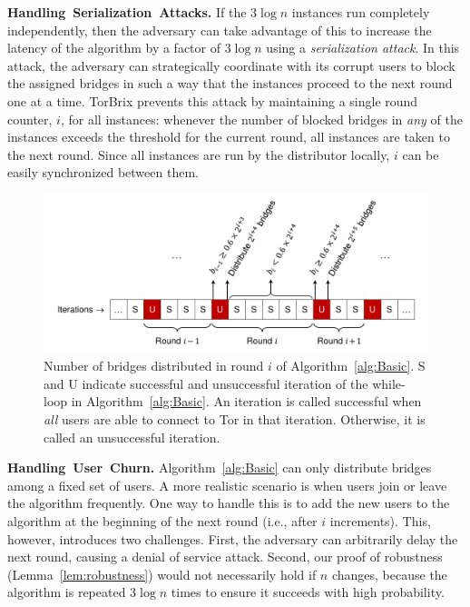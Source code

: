 \documentclass{llncs}
\newcommand{\ie}{i.e.}
\newcommand{\jared}[1]{}
\newcommand{\sfsize}{\fontsize{0.73\baselineskip}{0.73\baselineskip}\selectfont}
\newcommand{\sans}[1]{\textsf{\sfsize \mbox{#1}}}
\newcommand{\sansb}[1]{\textbf{\sans{\mbox{#1}}}}
\newcommand{\para}[1]{\vspace{0.55em} \noindent \sansb{{\mbox{#1}}}}
\newcommand{\brix}{\sans{TorBrix}\xspace}
\begin{document}
\para{Handling Serialization Attacks.} If the $3\log{n}$ instances run completely independently, then the adversary can take advantage of this to increase the latency of the algorithm by a factor of $3\log{n}$ using a \emph{serialization attack}. In this attack, the adversary can strategically coordinate with its corrupt users to block the assigned bridges in such a way that the instances proceed to the next round one at a time. 
\brix prevents this attack by maintaining a single round counter, $i$, for all instances: whenever the number of blocked bridges in \emph{any} of the instances exceeds the threshold for the current round, all instances are taken to the next round. Since all instances are run by the distributor locally, $i$ can be easily synchronized between them. %

\begin{figure}[t]
	\centering
	\includegraphics[width=0.88\linewidth]{images/rounds}
	\caption{Number of bridges distributed in round $i$ of Algorithm~\ref{alg:Basic}. S and U indicate successful and unsuccessful iteration of the while-loop in Algorithm~\ref{alg:Basic}. An iteration is called successful when \emph{all} users are able to connect to Tor in that iteration. Otherwise, it is called an unsuccessful iteration. }
	\label{fig:rounds}
\end{figure}

\para{Handling User Churn.} \label{sec:churn}
Algorithm~\ref{alg:Basic} can only distribute bridges among a fixed set of users. A more realistic scenario is when users join or leave the algorithm frequently. One way to handle this is to add the new users to the algorithm at the beginning of the next round (\ie, after $i$ increments). This, however, introduces two challenges. First, the adversary can arbitrarily delay the next round, causing a denial of service attack. Second, our proof of robustness (Lemma~\ref{lem:robustness}) would not necessarily hold if $n$ changes, because the algorithm is repeated $3\log{n}$ times to ensure it succeeds with high probability.
\end{document}

